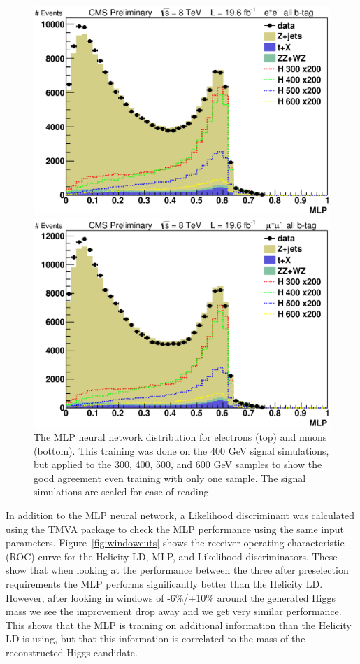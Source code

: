 \begin{figure}[htb!]
\begin{center}
\centerline{
\includegraphics[width=0.8\linewidth]{Optimization/MLP_el.eps}
}
\centerline{
\includegraphics[width=0.8\linewidth]{Optimization/MLP_mu.eps}
}
\caption{
The MLP neural network distribution for electrons (top) and muons (bottom).  This training was done on the 400 GeV signal simulations, but applied to the 300, 400, 500, and 600 GeV samples to show the good agreement even training with only one sample.  The signal simulations are scaled for ease of reading.
}
\label{fig:NNOutput}
\end{center}
\end{figure}

In addition to the MLP neural network, a Likelihood discriminant was calculated using the TMVA package to check the MLP performance using the same input parameters.  Figure~\ref{fig:windowcuts} shows the receiver operating characteristic (ROC) curve for the Helicity LD, MLP, and Likelihood discriminators. These show that when looking at the performance between the three after preselection requirements the MLP performs significantly better than the Helicity LD. However, after looking in windows of -6\%/+10\% around the generated Higgs mass we see the improvement drop away and we get very similar performance.  This shows that the MLP is training on additional information than the Helicity LD is using, but that this information is correlated to the mass of the reconstructed Higgs candidate.  


